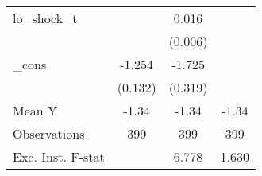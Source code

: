{\begin{tabular}{l*{3}{c}}
\addlinespace
lo\_shock\_t  &                     &       0.016\sym{**} &                     \\
            &                     &     (0.006)         &                     \\
\addlinespace
\_cons      &      -1.254\sym{***}&      -1.725\sym{***}&                     \\
            &     (0.132)         &     (0.319)         &                     \\
\midrule
Mean Y      &       -1.34         &       -1.34         &       -1.34         \\
Observations&         399         &         399         &         399         \\
Exc. Inst. F-stat&                     &       6.778         &       1.630         \\
\bottomrule
\end{tabular}
}
